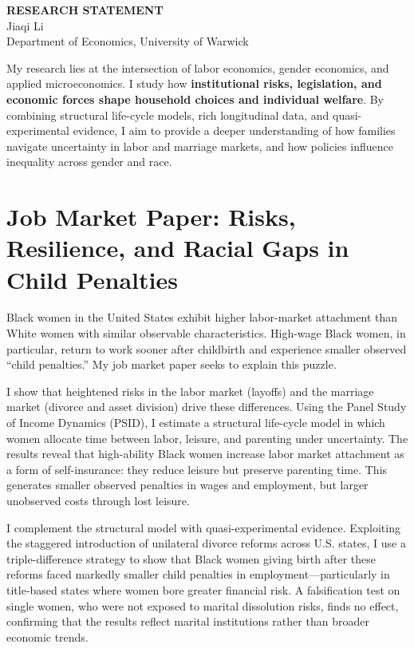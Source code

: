 \documentclass[11pt,a4paper]{article}
\begin{document}
\begin{center}
    {\Huge\bfseries RESEARCH STATEMENT} \\
    \vspace{0.5em}
    {\Large Jiaqi Li} \\
    \vspace{0.3em}
    Department of Economics, University of Warwick
\end{center}
\vspace{2em}

My research lies at the intersection of labor economics, gender economics, and applied microeconomics. I study how \textbf{institutional risks, legislation, and economic forces shape household choices and individual welfare}. By combining structural life-cycle models, rich longitudinal data, and quasi-experimental evidence, I aim to provide a deeper understanding of how families navigate uncertainty in labor and marriage markets, and how policies influence inequality across gender and race.

\section{Job Market Paper: Risks, Resilience, and Racial Gaps in Child Penalties}

Black women in the United States exhibit higher labor-market attachment than White women with similar observable characteristics. High-wage Black women, in particular, return to work sooner after childbirth and experience smaller observed ``child penalties.'' My job market paper seeks to explain this puzzle.

I show that heightened risks in the labor market (layoffs) and the marriage market (divorce and asset division) drive these differences. Using the Panel Study of Income Dynamics (PSID), I estimate a structural life-cycle model in which women allocate time between labor, leisure, and parenting under uncertainty. The results reveal that high-ability Black women increase labor market attachment as a form of self-insurance: they reduce leisure but preserve parenting time. This generates smaller observed penalties in wages and employment, but larger unobserved costs through lost leisure.

I complement the structural model with quasi-experimental evidence. Exploiting the staggered introduction of unilateral divorce reforms across U.S. states, I use a triple-difference strategy to show that Black women giving birth after these reforms faced markedly smaller child penalties in employment—particularly in title-based states where women bore greater financial risk. A falsification test on single women, who were not exposed to marital dissolution risks, finds no effect, confirming that the results reflect marital institutions rather than broader economic trends.
\end{document}
